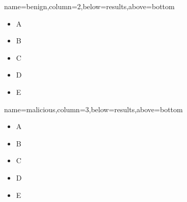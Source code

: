 \documentclass[landscape,specialSize,fontscale=0.3]{./poster/poster}
\begin{document}
\begin{poster}
    {name=benign,column=2,below=results,above=bottom}{
  \begin{itemize}\item A \item B \item C \item D \item E\end{itemize}
}

    {name=malicious,column=3,below=results,above=bottom}{
  \begin{itemize}\item A \item B \item C \item D \item E\end{itemize}
}

\end{poster}
\end{document}
